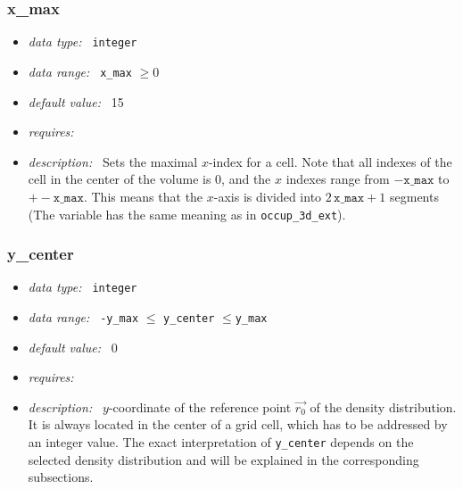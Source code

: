 \documentclass[a4paper,10pt]{article}
\begin{document}
\begin{appendix}
\subsubsection{x\_max}
\label{hydoptnl:xmax}
\begin{itemize}
 \item \textit{data type:~} \texttt{integer}
 \item \textit{data range:~} \texttt{x\_max} $\ge0$
 \item \textit{default value:~} 15
 \item \textit{requires:~} 
 \item \textit{description:~} Sets the maximal $x$-index for a cell. Note that
  all indexes of the cell in the center of the volume is 0, and the  $x$ 
  indexes range from $-\mathtt{x\_max}$ to $+-\mathtt{x\_max}$. This means that 
  the $x$-axis is divided into $2\, \mathtt{x\_max} +1$ segments (The variable 
  has the same meaning as in \texttt{occup\_3d\_ext}).
\end{itemize}

\subsubsection{y\_center}
\label{hydoptnl:ycenter}
\begin{itemize}
 \item \textit{data type:~} \texttt{integer}
 \item \textit{data range:~} \texttt{-y\_max} $ \leq$ \texttt{y\_center} 
  $\leq $\texttt{y\_max} 
 \item \textit{default value:~} 0
 \item \textit{requires:~} 
 \item \textit{description:~} $y$-coordinate of the reference point $\vec{r_0}$
  of the density distribution.  It is always located in the center of a grid 
  cell, which has to be addressed by an integer value. 
  The exact interpretation of \texttt{y\_center} depends on the selected 
  density distribution and will be 
  explained in the corresponding subsections.
\end{itemize}



\end{appendix}
\end{document}
